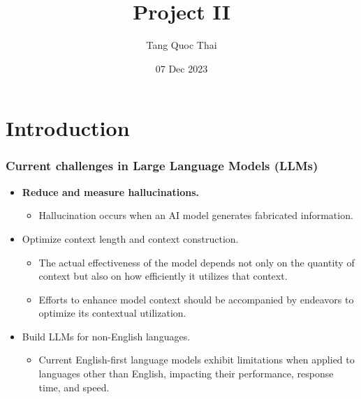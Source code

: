 \documentclass{beamer}
\title[Project II]{Project II} %
\author[Tang Quoc Thai]{\texorpdfstring{{\normalsize Tang Quoc Thai}}{Author}}
\institute[2270376] %
{

{\small Supervisor}\\
\medskip
{\small Assoc.\ Prof.\ Quan Thanh Tho}\\
\vspace{2cm}
\medskip
Ho Chi Minh City\\
University of Technology %

}
\date{07 Dec 2023} %
\newcounter{cont}
\begin{document}

\begin{frame}
\titlepage%
\end{frame}



\section{Introduction}
\begin{frame}[allowframebreaks]
\frametitle{Current challenges in Large Language Models (LLMs)}
\begin{itemize}
  \item \textbf{Reduce and measure hallucinations.}~\cite{kaddour2023challenges}
  \begin{itemize}
      \item Hallucination occurs when an AI model generates fabricated information.
  \end{itemize}
  \item Optimize context length and context construction.~\cite{kaddour2023challenges}
  \begin{itemize}
    \item The actual effectiveness of the model depends not only on the quantity of context but also on how efficiently it utilizes that context.
    \item Efforts to enhance model context should be accompanied by endeavors to optimize its contextual utilization.
  \end{itemize}
  \item Build LLMs for non-English languages.~\cite{kaddour2023challenges}
  \begin{itemize}
    \item Current English-first language models exhibit limitations when applied to languages other than English, impacting their performance, response time, and speed.
  \end{itemize}
\end{itemize}
\end{frame}
\end{document}
